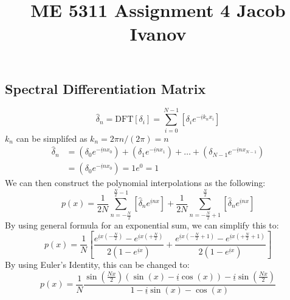 \documentclass[10pt, reqno]{amsart}
\begin{document}
\title{ME 5311 \quad Assignment 4 \quad Jacob Ivanov}

\maketitle
\begin{multicols}{2}
    \section{Spectral Differentiation Matrix}
    \begin{equation}
        \hat{\delta}_n = \mathrm{DFT} \left[ \delta_i \right] = \sum_{i = 0}^{N - 1} \left[ \delta_i e^{-\underline{i} k_n x_i} \right]
    \end{equation}
    $k_n$ can be simplifed as $k_n = 2 \pi n / (2 \pi) = n$
    \begin{equation}
        \begin{aligned}
        \hat{\delta}_n &= \left( \delta_0 e^{-\underline{i} n x_0} \right) + \left( \delta_1 e^{-\underline{i} n x_1} \right) + \ldots + \left( \delta_{N-1} e^{-\underline{i} n x_{N-1}} \right) \\
        &= \left( \delta_0 e^{-\underline{i} n x_0} \right) = 1e^0 = 1
        \end{aligned}
    \end{equation}
    We can then construct the polynomial interpolations as the following:
    \begin{equation}
        p(x) = \frac{1}{2N} \sum_{n = - \frac{N}{2}}^{\frac{N}{2}-1} \left[ \hat{\delta}_n e^{\underline{i} n x} \right] + \frac{1}{2N} \sum_{n = - \frac{N}{2} + 1}^{\frac{N}{2}} \left[ \hat{\delta}_n e^{\underline{i} n x} \right]
    \end{equation}
    By using general formula for an exponential sum, we can simplify this to:
    \begin{equation}
        p(x) = \frac{1}{N} \left[ \frac{e^{\underline{i} x \left(-\frac{N}{2}\right)} - e^{\underline{i} x \left(+\frac{N}{2}\right)}}{2 \left(1 - e^{\underline{i} x} \right)} + \frac{e^{\underline{i} x \left(-\frac{N}{2} + 1\right)} - e^{\underline{i} x \left(+\frac{N}{2} + 1\right)}}{2 \left(1 - e^{\underline{i} x} \right)} \right]
    \end{equation}
    By using Euler's Identity, this can be changed to:
    \begin{equation}
        p(x) = \frac{1}{N} \frac{\sin \left( \frac{N x}{2} \right) \left( \sin(x) - \underline{i} \cos(x) \right) - \underline{i} \sin \left( \frac{N x}{2} \right)}{1 - \underline{i} \sin(x) - \cos(x)}

\end{equation}
\end{multicols}
\end{document}
